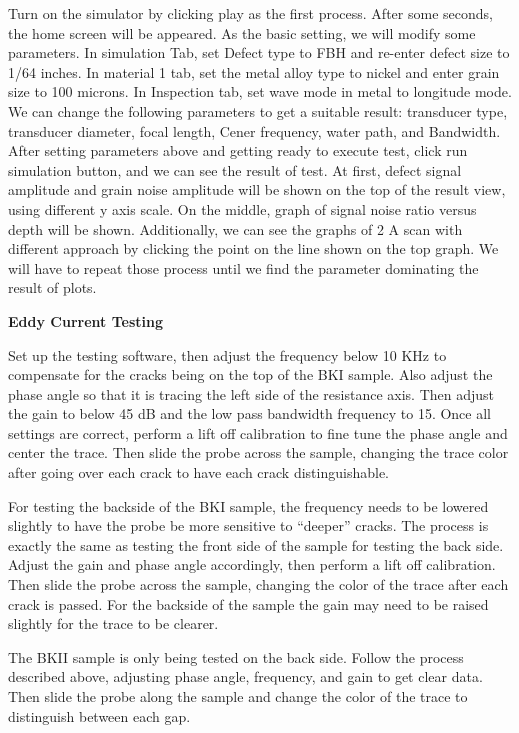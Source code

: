 \documentclass[12 pt]{report}
\begin{document}
Turn on the simulator by clicking play as the first process. After some seconds, the home screen will be appeared. As the basic setting, we will modify some parameters. In simulation Tab, set Defect type to FBH and re-enter defect size to 1/64 inches. In material 1 tab, set the metal alloy type to nickel and enter grain size to 100 microns. In Inspection tab, set wave mode in metal to longitude mode. We can change the following parameters to get a suitable result: transducer type, transducer diameter, focal length, Cener frequency, water path, and Bandwidth. After setting parameters above and getting ready to execute test, click run simulation button, and we can see the result of test. At first, defect signal amplitude and grain noise amplitude will be shown on the top of the result view, using different y axis scale. On the middle, graph of signal noise ratio versus depth will be shown. Additionally, we can see the graphs of 2 A scan with different approach by clicking the point on the line shown on the top graph. We will have to repeat those process until we find the parameter dominating the result of plots.

\textbf{Eddy Current Testing}

Set up the testing software, then adjust the frequency below 10 KHz to compensate for the cracks being on the top of the BKI sample. Also adjust the phase angle so that it is tracing the left side of the resistance axis. Then adjust the gain to below 45 dB and the low pass bandwidth frequency to 15. Once all settings are correct, perform a lift off calibration to fine tune the phase angle and center the trace. Then slide the probe across the sample, changing the trace color after going over each crack to have each crack distinguishable.

For testing the backside of the BKI sample, the frequency needs to be lowered slightly to have the probe be more sensitive to “deeper” cracks. The process is exactly the same as testing the front side of the sample for testing the back side. Adjust the gain and phase angle accordingly, then perform a lift off calibration. Then slide the probe across the sample, changing the color of the trace after each crack is passed. For the backside of the sample the gain may need to be raised slightly for the trace to be clearer.

The BKII sample is only being tested on the back side. Follow the process described above, adjusting phase angle, frequency, and gain to get clear data. Then slide the probe along the sample and change the color of the trace to distinguish between each gap.
\end{document}
